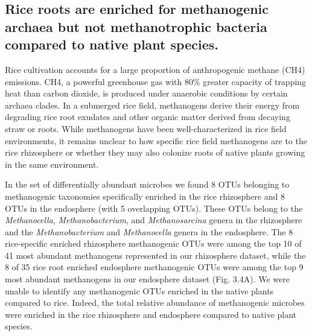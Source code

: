 \subsection{Rice roots are enriched for methanogenic archaea but not methanotrophic bacteria compared to native plant species.}

Rice cultivation accounts for a large proportion of anthropogenic methane (CH4) emissions. CH4, a powerful greenhouse gas with 80\% greater capacity of trapping heat than carbon dioxide, is produced under anaerobic conditions by certain archaea clades. In a submerged rice field, methanogens derive their energy from degrading rice root exudates and other organic matter derived from decaying straw or roots. While methanogens have been well-characterized in rice field environments, it remains unclear to how specific rice field methanogens are to the rice rhizosphere or whether they may also colonize roots of native plants growing in the same environment.

In the set of differentially abundant microbes we found 8 OTUs belonging to methanogenic taxonomies specifically enriched in the rice rhizosphere and 8 OTUs in the endosphere (with 5 overlapping OTUs). These OTUs belong to the \textit{Methanocella}, \textit{Methanobacterium}, and \textit{Methanosarcina} genera in the rhizosphere and the \textit{Methanobacterium} and \textit{Methanocella} genera in the endosphere. The 8 rice-specific enriched rhizosphere methanogenic OTUs were among the top 10 of 41 most abundant methanogens represented in our rhizosphere dataset, while the 8 of 35 rice root enriched endosphere methanogenic OTUs were among the top 9 most abundant methanogens in our endosphere dataset (Fig. 3.4A). We were unable to identify any methanogenic OTUs enriched in the native plants compared to rice. Indeed, the total relative abundance of methanogenic microbes were enriched in the rice rhizosphere and endosphere compared to native plant species.

